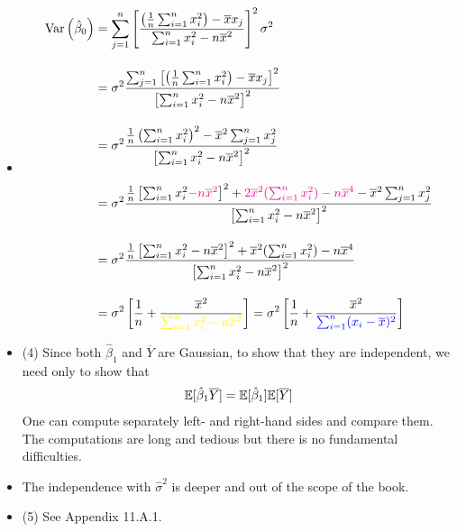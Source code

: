 \begin{frame}[fragile]
\begin{itemize}
	\item[]
	\begin{align*}
		\Var\left(\hat{\beta}_0\right) & = \sum_{j=1}^n \left[\frac{\left(\frac{1}{n}\sum_{i=1}^n x_i^2\right)  - \overline{x}  x_j}{\sum_{i=1}^n x_i^2 - n \overline{x}^2}\right]^2 \sigma^2 \\[1em]
		                               & = \sigma^2  \frac{\sum_{j=1}^n\left[\left(\frac{1}{n}\sum_{i=1}^n x_i^2\right)  - \overline{x}  x_j\right]^2}{\left[\sum_{i=1}^n x_i^2 - n \overline{x}^2\right]^2}\\[1em]
		                               & = \sigma^2  \frac{\frac{1}{n}\left(\sum_{i=1}^n x_i^2\right)^2 - \overline{x}^2\sum_{j=1}^n x_j^2}{\left[\sum_{i=1}^n x_i^2 - n \overline{x}^2\right]^2}\\[1em]
		                               & = \sigma^2  \frac{\frac{1}{n}\left[\sum_{i=1}^n x_i^2 \textcolor{magenta}{- n \overline{x}^2}\right]^2 + \textcolor{magenta}{2\overline{x}^2(\sum_{i=1}^n x_i^2)-n\overline{x}^4}- \overline{x}^2\sum_{j=1}^n x_j^2}{\left[\sum_{i=1}^n x_i^2 - n \overline{x}^2\right]^2}\\[1em]
		                               & = \sigma^2  \frac{\frac{1}{n}\left[\sum_{i=1}^n x_i^2 - n \overline{x}^2\right]^2 + \overline{x}^2(\sum_{i=1}^n x_i^2)-n\overline{x}^4}{\left[\sum_{i=1}^n x_i^2 - n \overline{x}^2\right]^2}\\[1em]
		                               & = \sigma^2 \left[\frac{1}{n}+  \frac{\overline{x}^2}{\textcolor{yellow}{\sum_{i=1}^n x_i^2 - n \overline{x}^2}} \right]
		                                = \sigma^2 \left[\frac{1}{n}+  \frac{\overline{x}^2}{\textcolor{blue}{\sum_{i=1}^n (x_i - \overline{x})^2}} \right]
	\end{align*}
\end{itemize}
\end{frame}
\begin{frame}[fragile]
\begin{itemize}
	\item[] (4) Since both $\hat{\beta}_1$ and $\overline{Y}$ are Gaussian, to show that they are independent, we need only to show that
	\begin{align*}
		\mathbb{E}[\hat{\beta}_1\overline{Y}]=\mathbb{E}[\hat{\beta}_1]\mathbb{E}[\overline{Y}]
	\end{align*}
	One can compute separately left- and right-hand sides and compare them. The computations are long and tedious but there is no fundamental difficulties.
	\bigskip
	\item[] The independence with $\hat{\sigma}^2$ is deeper and out of the scope of the book.
	\bigskip
	\item[] (5) See Appendix 11.A.1.\myEnd
\end{itemize}
\end{frame}
